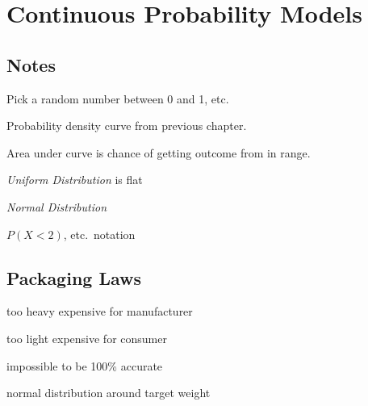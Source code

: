 \documentclass[letterpaper, landscape]{exam}
\begin{document}
  \section{Continuous Probability Models}
  \subsection{Notes}
  \begin{itemize*}
    \item Pick a random number between 0 and 1, etc.

    \item Probability density curve from previous chapter. 
  
    \item Area under curve is chance of getting outcome from in range.

    \item {\em Uniform Distribution\/} is flat

    \item {\em Normal Distribution\/}

    \item $P(X < 2)$, etc.\ notation

  \end{itemize*}

  \subsection{Packaging Laws}
  \begin{itemize*}
    \item too heavy expensive for manufacturer
    \item too light expensive for consumer
    \item impossible to be 100\% accurate
    \item normal distribution around target weight
  \end{itemize*}
\end{document}

